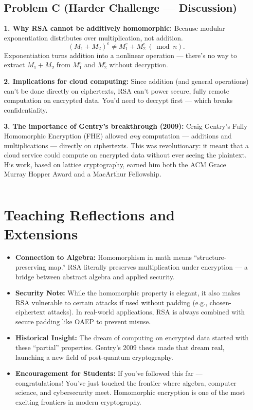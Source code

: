 \documentclass[12pt]{article}
\begin{document}
\subsection*{Problem C (Harder Challenge — Discussion)}

\textbf{1. Why RSA cannot be additively homomorphic:}  
Because modular exponentiation distributes over multiplication, not addition.  
\[
(M_1+M_2)^e \neq M_1^e + M_2^e \ (\bmod n).
\]
Exponentiation turns addition into a nonlinear operation — there’s no way to extract $M_1+M_2$ from $M_1^e$ and $M_2^e$ without decryption.

\textbf{2. Implications for cloud computing:}  
Since addition (and general operations) can’t be done directly on ciphertexts, RSA can’t power secure, fully remote computation on encrypted data.  
You’d need to decrypt first — which breaks confidentiality.

\textbf{3. The importance of Gentry’s breakthrough (2009):}  
Craig Gentry’s Fully Homomorphic Encryption (FHE) allowed \emph{any} computation — additions and multiplications — directly on ciphertexts.  
This was revolutionary: it meant that a cloud service could compute on encrypted data without ever seeing the plaintext.  
His work, based on lattice cryptography, earned him both the ACM Grace Murray Hopper Award and a MacArthur Fellowship.

\bigskip
\hrule
\vspace{0.5em}

\section*{Teaching Reflections and Extensions}

\begin{itemize}
  \item \textbf{Connection to Algebra:}  
    Homomorphism in math means “structure-preserving map.” RSA literally preserves multiplication under encryption — a bridge between abstract algebra and applied security.

  \item \textbf{Security Note:}  
    While the homomorphic property is elegant, it also makes RSA vulnerable to certain attacks if used without padding (e.g., chosen-ciphertext attacks).  
    In real-world applications, RSA is always combined with secure padding like OAEP to prevent misuse.

  \item \textbf{Historical Insight:}  
    The dream of computing on encrypted data started with these “partial” properties.  
    Gentry’s 2009 thesis made that dream real, launching a new field of post-quantum cryptography.

  \item \textbf{Encouragement for Students:}  
    If you’ve followed this far — congratulations! You’ve just touched the frontier where algebra, computer science, and cybersecurity meet.  
    Homomorphic encryption is one of the most exciting frontiers in modern cryptography.
\end{itemize}
\end{document}
